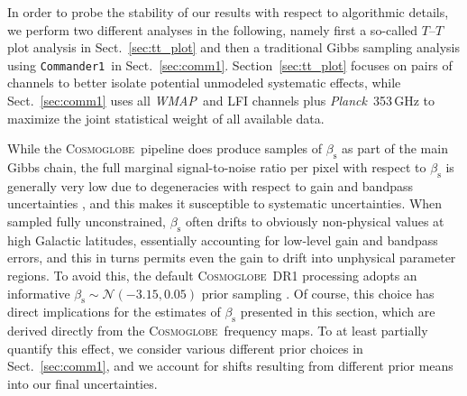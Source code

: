 \documentclass[twocolumn]{../../common/aa}
\def\WMAP{\emph{WMAP}}
\def\Planck{\emph{Planck}}
\def\commanderone{\texttt{Commander1}}
\def\commanderthree{\texttt{Commander3}}
\newcommand{\cosmoglobe}{\textsc{Cosmoglobe}}
\begin{document}

In order to probe the stability of our results with respect to algorithmic details, we perform two different analyses in the following, namely first a so-called $T$--$T$ plot analysis in Sect.~\ref{sec:tt_plot} and then a traditional Gibbs sampling analysis using \commanderone\ in Sect.~\ref{sec:comm1}. Section~\ref{sec:tt_plot} focuses on pairs of channels to better isolate potential unmodeled systematic effects, while Sect.~\ref{sec:comm1} uses all \WMAP\ and LFI channels plus \Planck\ 353\,GHz to maximize the joint statistical weight of all available data.

While the \cosmoglobe\ pipeline does produce samples of $\beta_{\mathrm{s}}$ as part of the main Gibbs chain, the full marginal signal-to-noise ratio per pixel with respect to $\beta_{\mathrm{s}}$ is generally very low due to degeneracies with respect to gain and bandpass uncertainties \citep{bp07,bp09}, and this makes it susceptible to systematic uncertainties. When sampled fully unconstrained, $\beta_{\mathrm{s}}$ often drifts to obviously non-physical values at high Galactic latitudes, essentially accounting for low-level gain and bandpass errors, and this in turns permits even the gain to drift into unphysical parameter regions. To avoid this, the default \cosmoglobe\ DR1 processing adopts an informative $\beta_\mathrm s\sim\mathcal N(-3.15, 0.05)$ prior sampling \citep{watts2023_dr1}. Of course, this choice has direct implications for the estimates of $\beta_{\mathrm{s}}$ presented in this section, which are derived directly from the \cosmoglobe\ frequency maps. To at least partially quantify this effect, we consider various different prior choices in Sect.~\ref{sec:comm1}, and we account for shifts resulting from different prior means into our final uncertainties.

\end{document}
